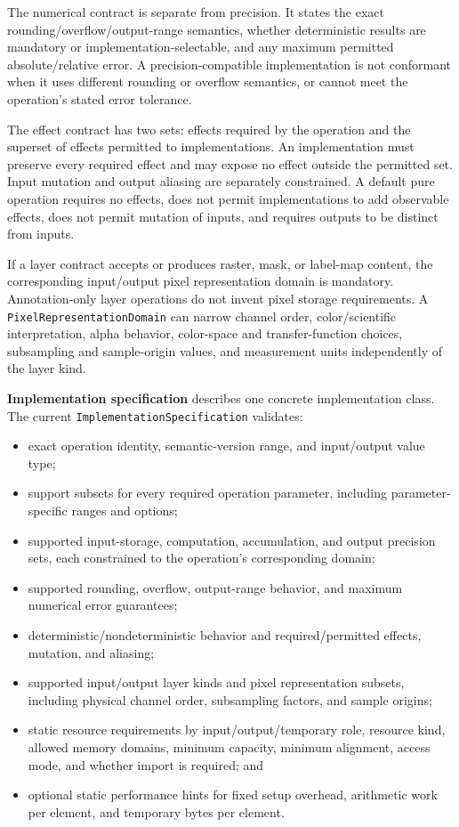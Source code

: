 \documentclass[11pt,a4paper,oneside]{article}
\begin{document}
The numerical contract is separate from precision. It states the exact rounding/overflow/output-range semantics, whether deterministic results are mandatory or implementation-selectable, and any maximum permitted absolute/relative error. A precision-compatible implementation is not conformant when it uses different rounding or overflow semantics, or cannot meet the operation's stated error tolerance.

The effect contract has two sets: effects required by the operation and the superset of effects permitted to implementations. An implementation must preserve every required effect and may expose no effect outside the permitted set. Input mutation and output aliasing are separately constrained. A default pure operation requires no effects, does not permit implementations to add observable effects, does not permit mutation of inputs, and requires outputs to be distinct from inputs.

If a layer contract accepts or produces raster, mask, or label-map content, the corresponding input/output pixel representation domain is mandatory. Annotation-only layer operations do not invent pixel storage requirements. A \texttt{PixelRepresentationDomain} can narrow channel order, color/scientific interpretation, alpha behavior, color-space and transfer-function choices, subsampling and sample-origin values, and measurement units independently of the layer kind.

\textbf{Implementation specification} describes one concrete implementation class. The current \texttt{ImplementationSpecification} validates:
\begin{itemize}
  \item exact operation identity, semantic-version range, and input/output value type;
  \item support subsets for every required operation parameter, including parameter-specific ranges and options;
  \item supported input-storage, computation, accumulation, and output precision sets, each constrained to the operation's corresponding domain;
  \item supported rounding, overflow, output-range behavior, and maximum numerical error guarantees;
  \item deterministic/nondeterministic behavior and required/permitted effects, mutation, and aliasing;
  \item supported input/output layer kinds and pixel representation subsets, including physical channel order, subsampling factors, and sample origins;
  \item static resource requirements by input/output/temporary role, resource kind, allowed memory domains, minimum capacity, minimum alignment, access mode, and whether import is required; and
  \item optional static performance hints for fixed setup overhead, arithmetic work per element, and temporary bytes per element.
\end{itemize}
\end{document}
